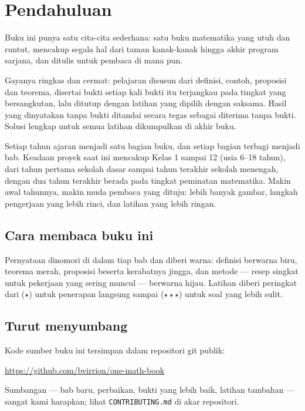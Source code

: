 \chapter{Pendahuluan}

Buku ini punya satu cita-cita sederhana: satu buku matematika yang utuh dan
runtut, mencakup segala hal dari taman kanak-kanak hingga akhir program
sarjana, dan ditulis untuk pembaca di mana pun.

Gayanya ringkas dan cermat: pelajaran disusun dari definisi, contoh,
proposisi dan teorema, disertai bukti setiap kali bukti itu terjangkau pada
tingkat yang bersangkutan, lalu ditutup dengan latihan yang dipilih dengan
saksama. Hasil yang dinyatakan tanpa bukti ditandai secara tegas sebagai
diterima tanpa bukti. Solusi lengkap untuk semua latihan dikumpulkan di
akhir buku.

Setiap tahun ajaran menjadi satu bagian buku, dan setiap bagian terbagi
menjadi bab. Keadaan proyek saat ini mencakup Kelas 1 sampai 12 (usia
6--18 tahun), dari tahun pertama sekolah dasar sampai tahun terakhir
sekolah menengah, dengan dua tahun terakhir berada pada tingkat peminatan
matematika. Makin awal tahunnya, makin muda pembaca yang dituju: lebih
banyak gambar, langkah pengerjaan yang lebih rinci, dan latihan yang lebih
ringan.

\section*{Cara membaca buku ini}

Pernyataan dinomori di dalam tiap bab dan diberi warna: definisi berwarna
biru, teorema merah, proposisi beserta kerabatnya jingga, dan metode ---
resep singkat untuk pekerjaan yang sering muncul --- berwarna hijau.
Latihan diberi peringkat dari ($\star$) untuk penerapan langsung sampai
($\star\star\star$) untuk soal yang lebih sulit.

\section*{Turut menyumbang}

Kode sumber buku ini tersimpan dalam repositori git publik:
\begin{center}
\url{https://github.com/bvirrion/one-math-book}
\end{center}
Sumbangan --- bab baru, perbaikan, bukti yang lebih baik, latihan tambahan
--- sangat kami harapkan; lihat \texttt{CONTRIBUTING.md} di akar
repositori.
